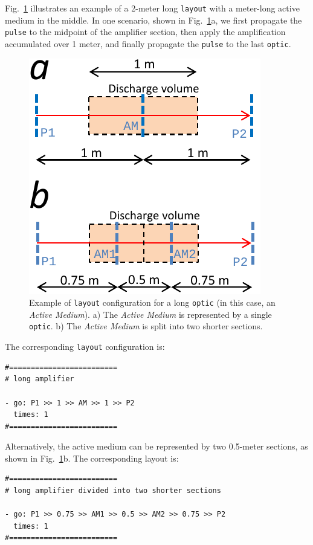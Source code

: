 \documentclass{report}
\begin{document}
Fig.~\ref{fig:layout} illustrates an example of a 2-meter long \texttt{layout} with a meter-long active medium in the middle. In one scenario, shown in Fig.~\ref{fig:layout}a, we first propagate the \texttt{pulse} to the midpoint of the amplifier section, then apply the amplification accumulated over 1 meter, and finally propagate the \texttt{pulse} to the last \texttt{optic}.
\begin{figure}[ht]
\centering
\includegraphics{images/layout}
\caption{Example of \texttt{layout} configuration for a long \texttt{optic} (in this case, an \textit{Active Medium}). a) The \textit{Active Medium} is represented by a single \texttt{optic}. b) The \textit{Active Medium} is split into two shorter sections.}\label{fig:layout}
\end{figure}
The corresponding \texttt{layout} configuration is:

\begin{verbatim}
#=========================
# long amplifier

- go: P1 >> 1 >> AM >> 1 >> P2
  times: 1
#=========================
\end{verbatim}

Alternatively, the active medium can be represented by two 0.5-meter sections, as shown in Fig.~\ref{fig:layout}b. The corresponding layout is:

\begin{verbatim}
#=========================
# long amplifier divided into two shorter sections

- go: P1 >> 0.75 >> AM1 >> 0.5 >> AM2 >> 0.75 >> P2
  times: 1
#=========================
\end{verbatim}
\end{document}

